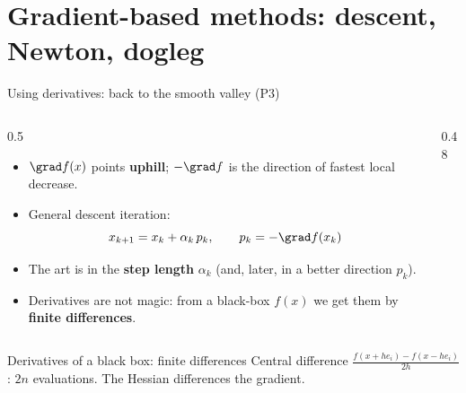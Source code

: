
\section{Gradient-based methods: descent, Newton, dogleg}

\begin{frame}{Using derivatives: back to the smooth valley (P3)}
  \begin{columns}[T]
    \begin{column}{0.5\textwidth}
      \begin{itemize}
        \item $\grad f(x)$ points \textbf{uphill}; $-\grad f$ is the direction of fastest local decrease.
        \item General descent iteration:
        \[ x_{k+1}=x_k+\alpha_k\,p_k,\qquad p_k=-\grad f(x_k) \]
        \item The art is in the \textbf{step length} $\alpha_k$ (and, later, in a better direction $p_k$).
        \item Derivatives are not magic: from a black-box $f(x)$ we get them by \textbf{finite differences}.
      \end{itemize}
    \end{column}
    \begin{column}{0.48\textwidth}
    \end{column}
  \end{columns}
\end{frame}

\begin{frame}{Derivatives of a black box: finite differences}
  \small Central difference $\frac{f(x+he_i)-f(x-he_i)}{2h}$: $2n$ evaluations. The Hessian differences the gradient.
\end{frame}

